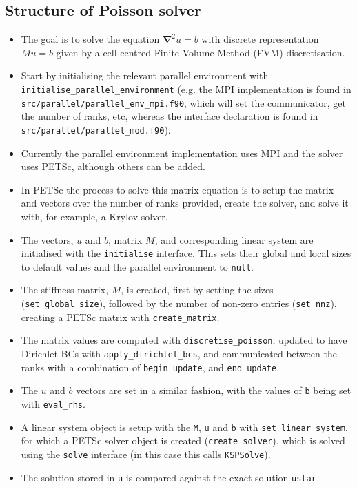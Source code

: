 \documentclass[11pt]{article}
\begin{document}
\subsection{Structure of Poisson solver}
\begin{itemize}
  \item The goal is to solve the equation ${\boldsymbol{\nabla}}^2 u = b$ with discrete representation $M u = b$ given by a cell-centred Finite Volume Method (FVM) discretisation.
  \item Start by initialising the relevant parallel environment with \texttt{initialise\_parallel\_environment} (e.g. the MPI implementation is found in \texttt{src/parallel/parallel\_env\_mpi.f90}, which will set the communicator, get the number of ranks, etc, whereas the interface declaration is found in \texttt{src/parallel/parallel\_mod.f90}). 
  \item Currently the parallel environment implementation uses MPI and the solver uses PETSc, although others can be added. 
  \item In PETSc the process to solve this matrix equation is to setup the matrix and vectors over the number of ranks provided, create the solver, and solve it with, for example, a Krylov solver.
  \item The vectors, $u$ and $b$, matrix $M$, and corresponding linear system are initialised with the \texttt{initialise} interface. This sets their global and local sizes to default values and the parallel environment to \texttt{null}.
  \item The stiffness matrix, $M$, is created, first by setting the sizes (\texttt{set\_global\_size}), followed by the number of non-zero entries (\texttt{set\_nnz}), creating a PETSc matrix with \texttt{create\_matrix}.
  \item The matrix values are computed with \texttt{discretise\_poisson}, updated to have Dirichlet BCs with \texttt{apply\_dirichlet\_bcs}, and communicated between the ranks with a combination of \texttt{begin\_update}, and \texttt{end\_update}.
  \item The $u$ and $b$ vectors are set in a similar fashion, with the values of \texttt{b} being set with \texttt{eval\_rhs}.
  \item A linear system object is setup with the \texttt{M}, \texttt{u} and \texttt{b} with \texttt{set\_linear\_system}, for which a PETSc solver object is created (\texttt{create\_solver}), which is solved using the \texttt{solve} interface (in this case this calls \texttt{KSPSolve}). 
  \item The solution stored in \texttt{u} is compared against the exact solution \texttt{ustar}
\end{itemize}
\end{document}
